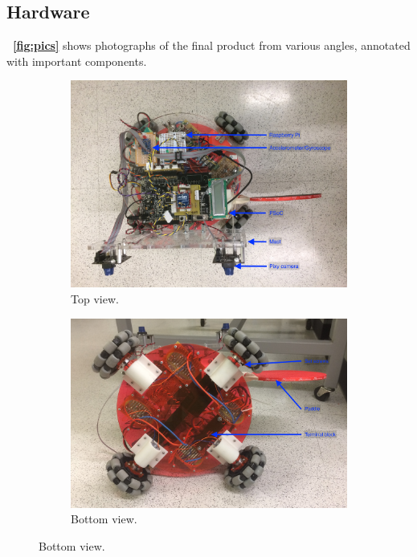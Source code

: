 \documentclass[letterpaper, 11pt]{article}
\newcommand*{\figref}[1]{\textbf{\figurename~\ref{#1}}}
\begin{document}
\begin{enumerate}[label=\textbf{\arabic*.}]
\section{Hardware}
\figref{fig:pics} shows photographs of the final product from various angles, annotated with important components.
\begin{figure}[H]
    \centering
    \begin{subfigure}[t]{0.8\textwidth}
        \includegraphics[width=\textwidth]{images/top.JPG}
        \caption{Top view.}
    \end{subfigure}

    \begin{subfigure}[t]{0.8\textwidth}
        \includegraphics[width=\textwidth]{images/bottom.JPG}
        \caption{Bottom view.}
    \end{subfigure}
\end{figure}


\end{enumerate}
\end{document}
